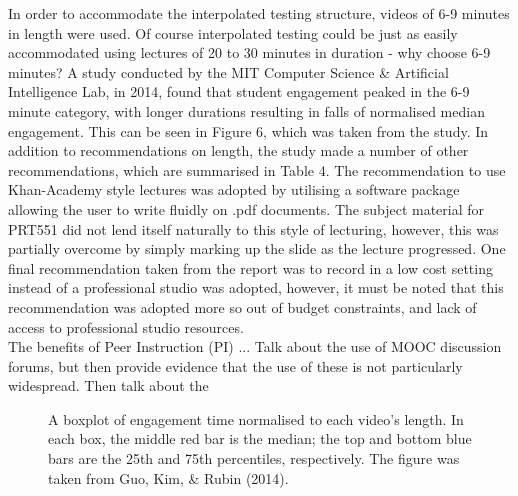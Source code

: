 \documentclass[a4paper]{article}
\begin{document}
In order to accommodate the interpolated testing structure, videos of 6-9 minutes in length were used. Of course interpolated testing could be just as easily accommodated using lectures of 20 to 30 minutes in duration - why choose 6-9 minutes? A study conducted by the MIT Computer Science \& Artificial Intelligence Lab, in 2014, found that student engagement peaked in the 6-9 minute category, with longer durations resulting in falls of normalised median engagement. This can be seen in Figure 6, which was taken from the study. In addition to recommendations on length, the study made a number of other recommendations, which are summarised in Table 4. The recommendation to use Khan-Academy style lectures was adopted by utilising a software package allowing the user to write fluidly on .pdf documents. The subject material for PRT551 did not lend itself naturally to this style of lecturing, however, this was partially overcome by simply marking up the slide as the lecture progressed. One final recommendation taken from the report was to record in a low cost setting instead of a professional studio was adopted, however, it must be noted that this recommendation was adopted more so out of budget constraints, and lack of access to professional studio resources.\\

The benefits of Peer Instruction (PI) ...
Talk about the use of MOOC discussion forums, but then provide evidence that the use of these is not particularly widespread. Then talk about the 

\begin{figure}[h]
\centering
{}
\caption{A boxplot of engagement time normalised to each video's length. In each box, the middle red bar is the median; the top and bottom blue bars are the 25th and 75th percentiles, respectively. The figure was taken from Guo, Kim, \& Rubin (2014).}
\end{figure}
\end{document}
